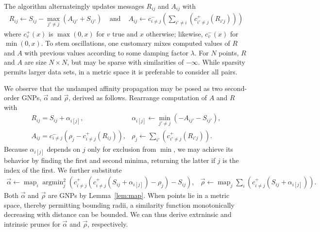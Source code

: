 \documentclass{article}
\DeclareMathOperator*{\argmin}{argmin}
\DeclareMathOperator*{\map}{map}
\newcommand{\ocpos}[1]{c^{+}_{#1}}
\newcommand{\ocneg}[1]{c^{-}_{#1}}
\newcommand{\cpos}[2]{\ocpos{#1 \neq #2}}
\newcommand{\cneg}[2]{\ocneg{#1 \neq #2}}
\newcommand{\respo}[2]{R_{#1#2}}
\newcommand{\avail}[2]{A_{#1#2}}
\newcommand{\simil}[2]{S_{#1#2}}
\newcommand{\vecrho}{\vec{\rho}}
\newcommand{\vecalpha}{\vec{\alpha}}
\newcommand{\frho}[1]{\rho_{#1}}
\newcommand{\falphaj}[2]{\alpha_{#1[#2]}}
\begin{document}
The algorithm alternateingly updates messages $\respo{i}{j}$ and
$\avail{i}{j}$ with
\[ \begin{array}{rcl}
  \respo{i}{j} \gets \simil{i}{j} - \max_{j' \neq j} (\avail{i}{j'} + \simil{i}{j'})
  & \text{ and } &
  \avail{i}{j} \gets \cneg{i}{j}( \sum_{i' \neq i} ( \cpos{i'}{j}(\respo{i'}{j}) ) )
\end{array} \]
where $\ocpos{v}(x)$ is $\max(0,x)$ for $v$ true and $x$ otherwise;
likewise, $\ocneg{v}(x)$ for $\min(0,x)$.
To stem oscillations, one customary mixes computed values of $R$ and $A$ with previous values according to some damping factor $\lambda$.
For $N$ points, $R$ and $A$ are size $N \times N$, but may be sparse with similarities of $-\infty$.
While sparsity permits larger data sets, in a metric space it is preferable to consider all pairs.

We observe that the undamped affinity propagation may be posed as two second-order GNPs, $\vecalpha$ and $\vecrho$, derived as follows.
Rearrange computation of $A$ and $R$ with
\[ \begin{array}{ll}
    \respo{i}{j} = \simil{i}{j} + \falphaj{i}{j}, & \falphaj{i}{j} \gets \min_{j' \neq j} (-\avail{i}{j'} - \simil{i}{j'}), \\
    \avail{i}{j} = \cneg{i}{j} (\frho{j} - \cpos{i}{j}(\respo{i}{j}) ), & \frho{j} \gets \sum_{i'} ( \cpos{i'}{j}(\respo{i'}{j}) ) .
\end{array} \]
Because $\falphaj{i}{j}$ depends on $j$ only for exclusion from $\min$, we may achieve its behavior by finding the first and second minima, returning the latter if $j$ is the index of the first.
We further substitute
\[ \begin{array}{rcl}
  \vecalpha \gets \map_{i} \argmin^2_{j} \!\left( \cpos{i}{j}(\cpos{i}{j}(\simil{i}{j} + \falphaj{i}{j}) - \frho{j}) - \simil{i}{j} \right)\! ,
  &
  \vecrho \gets \map_{j} \sum_{i} \!\left( \cpos{i}{j}(\simil{i}{j} + \falphaj{i}{j}) \right)\! .
\end{array} \]
Both $\vecalpha$ and $\vecrho$ are GNPs by Lemma~\ref{lem:map}.
When points lie in a metric space, thereby permitting bounding radii, a similarity function monotonically decreasing with distance can be bounded.
We can thus derive extrninsic and intrinsic prunes for $\vecalpha$ and $\vecrho$, respectively.
\end{document}
